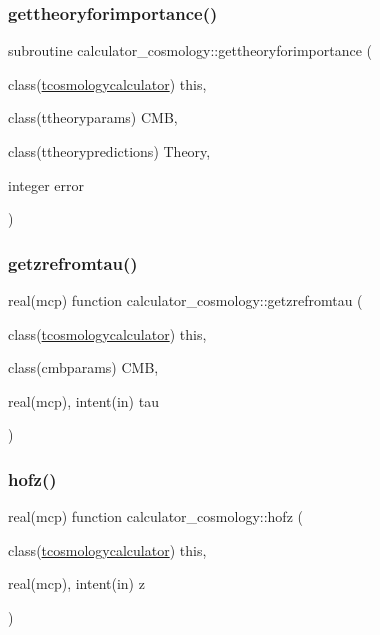 \subsubsection{\texorpdfstring{gettheoryforimportance()}{gettheoryforimportance()}}
{\footnotesize\ttfamily subroutine calculator\+\_\+cosmology\+::gettheoryforimportance (\begin{DoxyParamCaption}\item[{class(\mbox{\hyperlink{structcalculator__cosmology_1_1tcosmologycalculator}{tcosmologycalculator}})}]{this,  }\item[{class(ttheoryparams)}]{C\+MB,  }\item[{class(ttheorypredictions)}]{Theory,  }\item[{integer}]{error }\end{DoxyParamCaption})\hspace{0.3cm}{\ttfamily [private]}}

\mbox{\label{namespacecalculator__cosmology_a3f26a3af3732dbfea7715d565b44a385}} 
\subsubsection{\texorpdfstring{getzrefromtau()}{getzrefromtau()}}
{\footnotesize\ttfamily real(mcp) function calculator\+\_\+cosmology\+::getzrefromtau (\begin{DoxyParamCaption}\item[{class(\mbox{\hyperlink{structcalculator__cosmology_1_1tcosmologycalculator}{tcosmologycalculator}})}]{this,  }\item[{class(cmbparams)}]{C\+MB,  }\item[{real(mcp), intent(in)}]{tau }\end{DoxyParamCaption})\hspace{0.3cm}{\ttfamily [private]}}

\mbox{\label{namespacecalculator__cosmology_a04681553ca8acc12385e91c6b720105a}} 
\subsubsection{\texorpdfstring{hofz()}{hofz()}}
{\footnotesize\ttfamily real(mcp) function calculator\+\_\+cosmology\+::hofz (\begin{DoxyParamCaption}\item[{class(\mbox{\hyperlink{structcalculator__cosmology_1_1tcosmologycalculator}{tcosmologycalculator}})}]{this,  }\item[{real(mcp), intent(in)}]{z }\end{DoxyParamCaption})\hspace{0.3cm}{\ttfamily [private]}}

